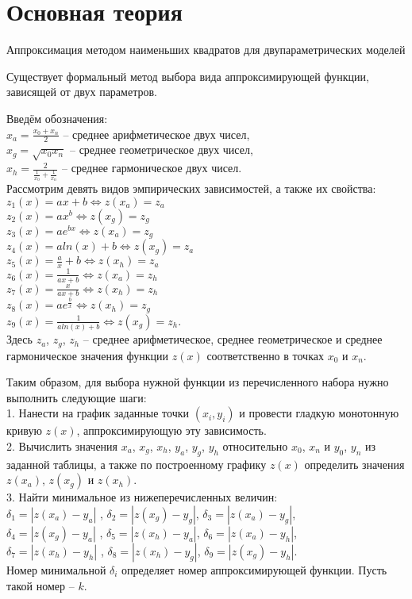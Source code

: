 \documentclass[a4paper, 14pt]{extarticle}
\begin{document}
\section{Основная теория}
\begin{justify}

\noindent\large {Аппроксимация методом наименьших квадратов для двупараметрических моделей}\\ \normalsize

Существует формальный метод выбора вида аппроксимирующей функции, зависящей от двух параметров. 

Введём обозначения: \\ 
$x_a = \frac{x_0 + x_n}{2}$ -- среднее арифметическое двух чисел, \\ 
$x_g = \sqrt{x_0 x_n}$ -- среднее геометрическое двух чисел, \\
$x_h = \frac{2}{\frac{1}{x_0} + \frac{1}{x_n}}$ -- среднее гармоническое двух чисел. \\

Рассмотрим девять видов эмпирических зависимостей, а также их свойства: \\
$z_1(x) = ax + b \iff z(x_a) = z_a$ \\
$z_2(x) = ax^b \iff z(x_g) = z_g$ \\
$z_3(x) = ae^{bx} \iff z(x_a) = z_g$ \\
$z_4(x) = a ln(x) + b \iff z(x_g) = z_a$ \\
$z_5(x) = \frac{a}{x} + b \iff z(x_h) = z_a$ \\
$z_6(x) = \frac{1}{ax + b} \iff z(x_a) = z_h$ \\
$z_7(x) = \frac{x}{ax + b} \iff z(x_h) = z_h$ \\
$z_8(x) = ae^{\frac{b}{x}} \iff z(x_h) = z_g$ \\
$z_9(x) = \frac{1}{a ln(x) + b} \iff z(x_g) = z_h$. \\
Здесь $z_a$, $z_g$, $z_h$ -- среднее арифметическое, среднее геометрическое 
и среднее гармоническое значения функции $z(x)$ соответственно в точках $x_0$ и $x_n$.

Таким образом, для выбора нужной функции из перечисленного набора нужно выполнить 
следующие шаги: \\
1. Нанести на график заданные точки $(x_i, y_i)$ и провести гладкую монотонную кривую $z(x)$, 
аппроксимирующую эту зависимость. \\
2. Вычислить значения $x_a$, $x_g$, $x_h$, $y_a$, $y_g$, $y_h$ относительно $x_0$, $x_n$ и $y_0$, $y_n$ из заданной 
таблицы, а также по построенному графику $z(x)$ определить значения $z(x_a)$, $z(x_g)$ и $z(x_h)$. \\
3. Найти минимальное из нижеперечисленных величин: \\
$\delta_1 = |z(x_a) - y_a|$ , $\delta_2 = |z(x_g) - y_g|$, $\delta_3 = |z(x_a) - y_g|$, \\
$\delta_4 = |z(x_g) - y_a|$ , $\delta_5 = |z(x_h) - y_a|$, $\delta_6 = |z(x_a) - y_h|$, \\
$\delta_7 = |z(x_h) - y_h|$ , $\delta_8 = |z(x_h) - y_g|$, $\delta_9 = |z(x_g) - y_h|$. \\
Номер минимальной $\delta_i$ определяет номер аппроксимирующей функции. Пусть такой номер -- $k$.


\end{justify}
\end{document}
